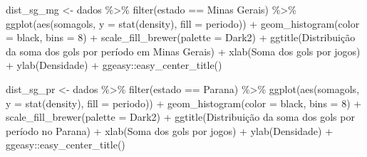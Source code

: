 \documentclass[
]{article}
\newenvironment{Shaded}{\begin{snugshade}}{\end{snugshade}}
\newcommand{\AttributeTok}[1]{\textcolor[rgb]{0.77,0.63,0.00}{#1}}
\newcommand{\DecValTok}[1]{\textcolor[rgb]{0.00,0.00,0.81}{#1}}
\newcommand{\FunctionTok}[1]{\textcolor[rgb]{0.00,0.00,0.00}{#1}}
\newcommand{\NormalTok}[1]{#1}
\newcommand{\OtherTok}[1]{\textcolor[rgb]{0.56,0.35,0.01}{#1}}
\newcommand{\SpecialCharTok}[1]{\textcolor[rgb]{0.00,0.00,0.00}{#1}}
\newcommand{\StringTok}[1]{\textcolor[rgb]{0.31,0.60,0.02}{#1}}
\begin{document}
\begin{Shaded}
\begin{Highlighting}[]
\NormalTok{dist\_sg\_mg }\OtherTok{\textless{}{-}}\NormalTok{ dados }\SpecialCharTok{\%\textgreater{}\%} \FunctionTok{filter}\NormalTok{(estado }\SpecialCharTok{==} \StringTok{\textquotesingle{}Minas Gerais\textquotesingle{}}\NormalTok{) }\SpecialCharTok{\%\textgreater{}\%}
  \FunctionTok{ggplot}\NormalTok{(}\FunctionTok{aes}\NormalTok{(somagols, }\AttributeTok{y =} \FunctionTok{stat}\NormalTok{(density), }\AttributeTok{fill =}\NormalTok{ periodo)) }\SpecialCharTok{+} 
  \FunctionTok{geom\_histogram}\NormalTok{(}\AttributeTok{color =} \StringTok{\textquotesingle{}black\textquotesingle{}}\NormalTok{, }\AttributeTok{bins =} \DecValTok{8}\NormalTok{) }\SpecialCharTok{+} 
  \FunctionTok{scale\_fill\_brewer}\NormalTok{(}\AttributeTok{palette =} \StringTok{\textquotesingle{}Dark2\textquotesingle{}}\NormalTok{) }\SpecialCharTok{+}
  \FunctionTok{ggtitle}\NormalTok{(}\StringTok{\textquotesingle{}Distribuição da soma dos gols por período em Minas Gerais\textquotesingle{}}\NormalTok{) }\SpecialCharTok{+}
  \FunctionTok{xlab}\NormalTok{(}\StringTok{\textquotesingle{}Soma dos gols por jogos\textquotesingle{}}\NormalTok{) }\SpecialCharTok{+} \FunctionTok{ylab}\NormalTok{(}\StringTok{\textquotesingle{}Densidade\textquotesingle{}}\NormalTok{) }\SpecialCharTok{+}
\NormalTok{  ggeasy}\SpecialCharTok{::}\FunctionTok{easy\_center\_title}\NormalTok{()}

\NormalTok{dist\_sg\_pr }\OtherTok{\textless{}{-}}\NormalTok{ dados }\SpecialCharTok{\%\textgreater{}\%} \FunctionTok{filter}\NormalTok{(estado }\SpecialCharTok{==} \StringTok{\textquotesingle{}Parana\textquotesingle{}}\NormalTok{) }\SpecialCharTok{\%\textgreater{}\%}
  \FunctionTok{ggplot}\NormalTok{(}\FunctionTok{aes}\NormalTok{(somagols, }\AttributeTok{y =} \FunctionTok{stat}\NormalTok{(density), }\AttributeTok{fill =}\NormalTok{ periodo)) }\SpecialCharTok{+} 
  \FunctionTok{geom\_histogram}\NormalTok{(}\AttributeTok{color =} \StringTok{\textquotesingle{}black\textquotesingle{}}\NormalTok{, }\AttributeTok{bins =} \DecValTok{8}\NormalTok{) }\SpecialCharTok{+} 
  \FunctionTok{scale\_fill\_brewer}\NormalTok{(}\AttributeTok{palette =} \StringTok{\textquotesingle{}Dark2\textquotesingle{}}\NormalTok{) }\SpecialCharTok{+}
  \FunctionTok{ggtitle}\NormalTok{(}\StringTok{\textquotesingle{}Distribuição da soma dos gols por período no Parana\textquotesingle{}}\NormalTok{) }\SpecialCharTok{+}
  \FunctionTok{xlab}\NormalTok{(}\StringTok{\textquotesingle{}Soma dos gols por jogos\textquotesingle{}}\NormalTok{) }\SpecialCharTok{+} \FunctionTok{ylab}\NormalTok{(}\StringTok{\textquotesingle{}Densidade\textquotesingle{}}\NormalTok{) }\SpecialCharTok{+}
\NormalTok{  ggeasy}\SpecialCharTok{::}\FunctionTok{easy\_center\_title}\NormalTok{()}


\end{Highlighting}
\end{Shaded}
\end{document}
